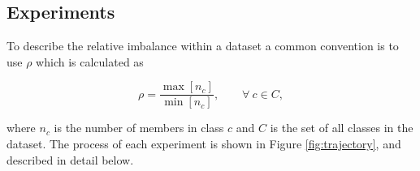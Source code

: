 \documentclass[journal]{IEEEtran}
\begin{document}
	\begin{comment}

	\subsection{Data Exploration}
	
	In the final pre-processing phase of the diabetes dataset, we undertook further exploration of the remaining features to refine our selection.
	
	We initially eliminated features that exhibited extremely low variance. In this context, features related to heavy alcohol consumption and stroke were dropped due to their negligible number of positive cases, especially in scenarios with high $\rho$.
	
	Subsequently, we identified features such as `Sex', `Smoker', `Fruits', and `Veggies' that demonstrated a very low correlation with the response variable. After their removal, we were left with a reduced feature set comprising six elements.
	
	In the final step, we examined the distribution of the remaining features using a kernel density plot method.
	The results of this can be seen in Figure \ref{fig:kdedistro}
	Additionally, to mitigate the impact of skewness in each feature, 'BMI' and 'Physical Health' were further subjected to quantile normalization.
	All of the features were then min-max normalized to a 0 to 1 domain.. 

	\begin{figure*}
		\centering
		\texttt{[image: Images/kde\_distro]}
		\caption{Kernel Densities of Features.}
		\label{fig:kdedistro}
	\end{figure*}
	\end{comment}
	
\subsection{Experiments}

	To describe the relative imbalance within a dataset a common convention is to use $\rho$ which is calculated as

	\begin{equation}
		\rho = \frac{\max[n_c]}{\min[n_c]}, \qquad \forall\ c \in C,
	\end{equation}
	
	where $n_c$ is the number of members in class $c$ and $C$ is the set of all classes in the dataset.
	The process of each experiment is shown in Figure \ref{fig:trajectory}, and described in detail below.
\end{document}
